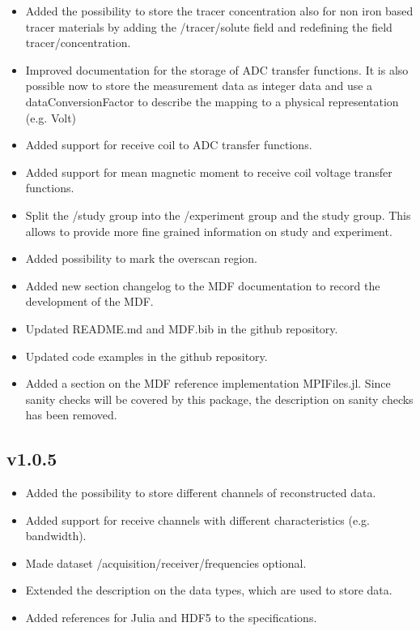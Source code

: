 \documentclass[landscape,a4paper]{article} %
\newcommand{\inlvar}[1]{{\ttfamily#1}}
\begin{document}
\begin{multicols}{2}
\begin{itemize}
	\item Added the possibility to store the tracer concentration also for non iron based tracer materials by adding the \inlvar{/tracer/solute} field and redefining the field \inlvar{tracer/concentration}.
 	\item Improved documentation for the storage of ADC transfer functions. It is also possible now to store the measurement data as integer data and use a \inlvar{dataConversionFactor} to describe the mapping to a physical representation (e.g. Volt)
 	\item Added support for receive coil to ADC transfer functions.
 	\item Added support for mean magnetic moment to receive coil voltage transfer functions.
	\item Split the \inlvar{/study} group into the \inlvar{/experiment} group and the study group. This allows to provide more fine grained information on study and experiment.
	\item Added possibility to mark the overscan region.
	\item Added new section changelog to the MDF documentation to record the development of the MDF.
	\item Updated \inlvar{README.md} and \inlvar{MDF.bib} in the github repository.
	\item Updated code examples in the github repository.
	\item Added a section on the MDF reference implementation MPIFiles.jl. Since sanity checks will be covered by this package, the description on sanity checks has been removed.
\end{itemize}


\subsection{v1.0.5}

\begin{itemize}
	\item Added the possibility to store different channels of reconstructed data.
	\item Added support for receive channels with different characteristics (e.g. bandwidth).
	\item Made dataset \inlvar{/acquisition/receiver/frequencies} optional.
	\item Extended the description on the data types, which are used to store data.
	\item Added references for Julia and HDF5 to the specifications.
\end{itemize}



\end{multicols}
\end{document}
